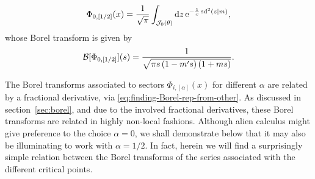 \documentclass[11pt,a4paper]{article}
\newcommand{\CB}{{\cal B}}
\newcommand{\CJ}{{\cal J}}
\newcommand{\be}{\begin{equation}}
\newcommand{\ee}{\end{equation}}
\newcommand{\rme}{{\mathrm{e}}}
\newcommand{\rmd}{{\mathrm{d}}}
\begin{document}
%
\be
\Phi_{0,[1/2]}(x) = \frac{1}{\sqrt{\pi}} \int_{\CJ_0 (\theta)} \rmd z\, \rme^{-\frac{1}{x}\, \mathrm{sd}^2 (z | m)},
\ee 
%
\noindent
whose Borel transform is given by
%
\be
\CB [\Phi_{0,[1/2]}] (s) = \frac{1}{\sqrt{\pi s \left( 1 - m^\prime s \right) \left( 1 + m s \right)}}.
\ee

The Borel transforms associated to sectors $\Phi_{i,[\alpha]}(x)$ for different $\alpha$ are related by a fractional derivative, via \eqref{eq:finding-Borel-rep-from-other}. As discussed in section~\ref{sec:borel}, and due to the involved fractional derivatives, these Borel transforms are related in highly non-local fashions. Although alien calculus might give preference to the choice $\alpha=0$, we shall demonstrate below that it may also be illuminating to work with $\alpha=1/2$. In fact, herein we will find a surprisingly simple relation between the Borel transforms of the series associated with the different critical points.
\end{document}
